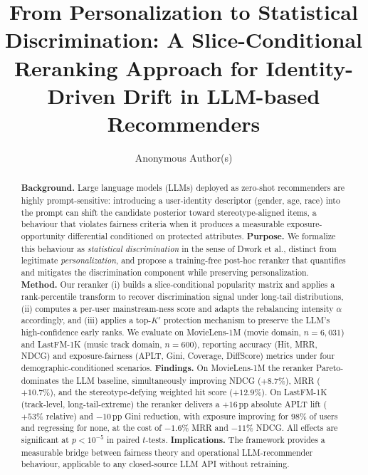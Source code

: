 \documentclass[sigconf,review,anonymous]{acmart}
\begin{document}
\title{From Personalization to Statistical Discrimination: A Slice-Conditional Reranking Approach for Identity-Driven Drift in LLM-based Recommenders}

\author{Anonymous Author(s)}

\renewcommand{\shortauthors}{Anonymous}

\begin{abstract}
\textbf{Background.} Large language models (LLMs) deployed as zero-shot recommenders are highly prompt-sensitive: introducing a user-identity descriptor (gender, age, race) into the prompt can shift the candidate posterior toward stereotype-aligned items, a behaviour that violates fairness criteria when it produces a measurable exposure-opportunity differential conditioned on protected attributes.
\textbf{Purpose.} We formalize this behaviour as \emph{statistical discrimination} in the sense of Dwork et al., distinct from legitimate \emph{personalization}, and propose a training-free post-hoc reranker that quantifies and mitigates the discrimination component while preserving personalization.
\textbf{Method.} Our reranker (i) builds a slice-conditional popularity matrix and applies a rank-percentile transform to recover discrimination signal under long-tail distributions, (ii) computes a per-user mainstream-ness score and adapts the rebalancing intensity $\alpha$ accordingly, and (iii) applies a top-$K'$ protection mechanism to preserve the LLM's high-confidence early ranks. We evaluate on MovieLens-1M (movie domain, $n=6{,}031$) and LastFM-1K (music track domain, $n=600$), reporting accuracy (Hit, MRR, NDCG) and exposure-fairness (APLT, Gini, Coverage, DiffScore) metrics under four demographic-conditioned scenarios.
\textbf{Findings.} On MovieLens-1M the reranker Pareto-dominates the LLM baseline, simultaneously improving NDCG (${+}8.7\%$), MRR (${+}10.7\%$), and the stereotype-defying weighted hit score (${+}12.9\%$). On LastFM-1K (track-level, long-tail-extreme) the reranker delivers a $+16$\,pp absolute APLT lift (${+}53\%$ relative) and $-10$\,pp Gini reduction, with exposure improving for $98\%$ of users and regressing for none, at the cost of $-1.6\%$ MRR and $-11\%$ NDCG. All effects are significant at $p < 10^{-5}$ in paired $t$-tests.
\textbf{Implications.} The framework provides a measurable bridge between fairness theory and operational LLM-recommender behaviour, applicable to any closed-source LLM API without retraining.
\end{abstract}
\end{document}
